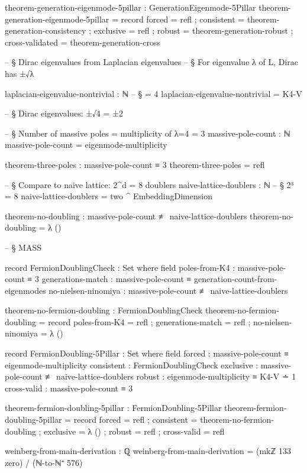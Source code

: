 \documentclass[11pt,a4paper]{book}
\begin{document}
\begin{code}
theorem-generation-eigenmode-5pillar : GenerationEigenmode-5Pillar
theorem-generation-eigenmode-5pillar = record
  { forced          = refl
  ; consistent      = theorem-generation-consistency
  ; exclusive       = refl
  ; robust          = theorem-generation-robust
  ; cross-validated = theorem-generation-cross
  }

-- § Dirac eigenvalues from Laplacian eigenvalues
-- § For eigenvalue λ of L, Dirac has ±√λ

laplacian-eigenvalue-nontrivial : ℕ
-- § = 4
laplacian-eigenvalue-nontrivial = K4-V

-- § Dirac eigenvalues: ±√4 = ±2

-- § Number of massive poles = multiplicity of λ=4 = 3
massive-pole-count : ℕ
massive-pole-count = eigenmode-multiplicity

theorem-three-poles : massive-pole-count ≡ 3
theorem-three-poles = refl

-- § Compare to naive lattice: 2^d = 8 doublers
naive-lattice-doublers : ℕ
-- § 2³ = 8
naive-lattice-doublers = two ^ EmbeddingDimension

theorem-no-doubling : massive-pole-count ≢ naive-lattice-doublers
theorem-no-doubling = λ ()


-- § MASS

record FermionDoublingCheck : Set where
  field
    poles-from-K4        : massive-pole-count ≡ 3
    generations-match    : massive-pole-count ≡ generation-count-from-eigenmodes
    no-nielsen-ninomiya  : massive-pole-count ≢ naive-lattice-doublers
    
theorem-no-fermion-doubling : FermionDoublingCheck
theorem-no-fermion-doubling = record
  { poles-from-K4       = refl
  ; generations-match   = refl
  ; no-nielsen-ninomiya = λ ()
  }

record FermionDoubling-5Pillar : Set where
  field
    forced       : massive-pole-count ≡ eigenmode-multiplicity
    consistent   : FermionDoublingCheck
    exclusive    : massive-pole-count ≢ naive-lattice-doublers
    robust       : eigenmode-multiplicity ≡ K4-V ∸ 1
    cross-valid  : massive-pole-count ≡ 3

theorem-fermion-doubling-5pillar : FermionDoubling-5Pillar
theorem-fermion-doubling-5pillar = record
  { forced      = refl
  ; consistent  = theorem-no-fermion-doubling
  ; exclusive   = λ ()
  ; robust      = refl
  ; cross-valid = refl
  }

weinberg-from-main-derivation : ℚ
weinberg-from-main-derivation = (mkℤ 133 zero) / (ℕ-to-ℕ⁺ 576)


\end{code}
\end{document}
